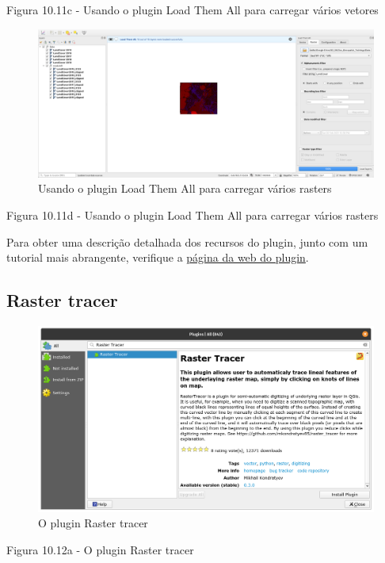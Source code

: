 \documentclass[
]{krantz}
\begin{document}
Figura 10.11c - Usando o plugin Load Them All para carregar vários vetores

\begin{figure}
\centering
\includegraphics{media/modulo10/fig1011_d.png}
\caption{Usando o plugin Load Them All para carregar vários rasters}
\end{figure}

Figura 10.11d - Usando o plugin Load Them All para carregar vários rasters

Para obter uma descrição detalhada dos recursos do plugin, junto com um tutorial mais abrangente, verifique a \href{https://github.com/gacarrillor/loadthemall}{página da web do plugin}.

\hypertarget{raster-tracer}{%
\subsection{Raster tracer}\label{raster-tracer}}

\begin{figure}
\centering
\includegraphics{media/modulo10/fig1012_a.png}
\caption{O plugin Raster tracer}
\end{figure}

Figura 10.12a - O plugin Raster tracer
\end{document}
